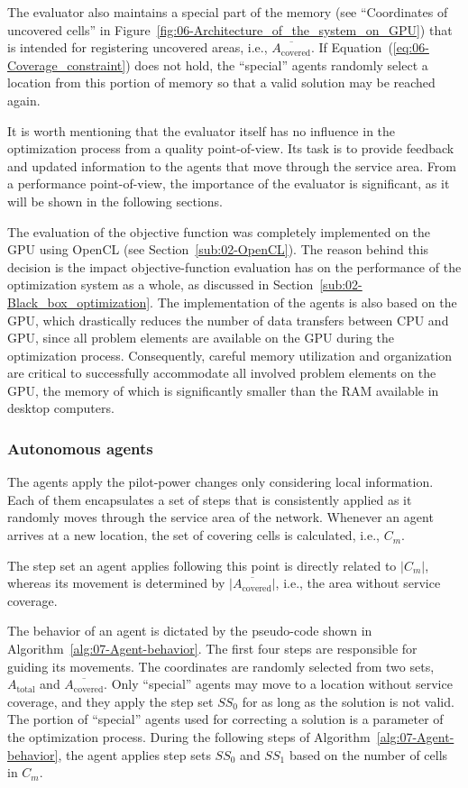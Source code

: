 The evaluator also maintains a special part of the memory (see ``Coordinates
of uncovered cells'' in Figure~\ref{fig:06-Architecture_of_the_system_on_GPU})
that is intended for registering uncovered areas, i.e., $\overline{A_{\mathrm{covered}}}$.
If Equation~(\ref{eq:06-Coverage_constraint}) does not hold, the
``special'' agents randomly select a location from this portion
of memory so that a valid solution may be reached again.

It is worth mentioning that the evaluator itself has no influence
in the optimization process from a quality point-of-view. Its task
is to provide feedback and updated information to the agents that
move through the service area. From a performance point-of-view, the
importance of the evaluator is significant, as it will be shown in
the following sections.

\bigskip{}


The evaluation of the objective function was completely implemented
on the GPU using OpenCL (see Section~\ref{sub:02-OpenCL}). The reason
behind this decision is the impact objective-function evaluation has
on the performance of the optimization system as a whole, as discussed
in Section~\ref{sub:02-Black_box_optimization}. The implementation
of the agents is also based on the GPU, which drastically reduces
the number of data transfers between CPU and GPU, since all problem
elements are available on the GPU during the optimization process.
Consequently, careful memory utilization and organization are critical
to successfully accommodate all involved problem elements on the GPU,
the memory of which is significantly smaller than the RAM available
in desktop computers.


\subsubsection{Autonomous agents}

The agents apply the pilot-power changes only considering local information.
Each of them encapsulates a set of steps that is consistently applied
as it randomly moves through the service area of the network. Whenever
an agent arrives at a new location, the set of covering cells is calculated,
i.e., $C_{m}$.

The step set an agent applies following this point is directly related
to $\vert C_{m}\vert$, whereas its movement is determined by $\vert\overline{A_{\mathrm{covered}}}\vert$,
i.e., the area without service coverage.

The behavior of an agent is dictated by the pseudo-code shown in Algorithm~\ref{alg:07-Agent-behavior}.
The first four steps are responsible for guiding its movements. The
coordinates are randomly selected from two sets, $A_{\mathrm{total}}$
and $\overline{A_{\mathrm{covered}}}$. Only ``special'' agents
may move to a location without service coverage, and they apply the
step set $SS_{0}$ for as long as the solution is not valid. The portion
of ``special'' agents used for correcting a solution is a parameter
of the optimization process. During the following steps of Algorithm~\ref{alg:07-Agent-behavior},
the agent applies step sets $SS_{0}$ and $SS_{1}$ based on the number
of cells in $C_{m}$.

